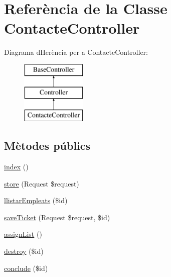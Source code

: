 \hypertarget{class_app_1_1_http_1_1_controllers_1_1_contacte_controller}{}\section{Referència de la Classe Contacte\+Controller}
\label{class_app_1_1_http_1_1_controllers_1_1_contacte_controller}
Diagrama d\textquotesingle{}Herència per a Contacte\+Controller\+:\begin{figure}[H]
\begin{center}
\leavevmode
\includegraphics[height=3.000000cm]{class_app_1_1_http_1_1_controllers_1_1_contacte_controller}
\end{center}
\end{figure}
\subsection*{Mètodes públics}
\begin{DoxyCompactItemize}
\item 
\mbox{\hyperlink{class_app_1_1_http_1_1_controllers_1_1_contacte_controller_a149eb92716c1084a935e04a8d95f7347}{index}} ()
\item 
\mbox{\hyperlink{class_app_1_1_http_1_1_controllers_1_1_contacte_controller_a9ef485163104597c12185b53cdacf638}{store}} (Request \$request)
\item 
\mbox{\hyperlink{class_app_1_1_http_1_1_controllers_1_1_contacte_controller_af2efdf19fa0bd964c7ca86e6e05f4e4a}{llistar\+Empleats}} (\$id)
\item 
\mbox{\hyperlink{class_app_1_1_http_1_1_controllers_1_1_contacte_controller_a55b79e82f946d0c70ed79fa25e322222}{save\+Ticket}} (Request \$request, \$id)
\item 
\mbox{\hyperlink{class_app_1_1_http_1_1_controllers_1_1_contacte_controller_a802b8d1289d1fc8fe0a2b05b205ef2ed}{assign\+List}} ()
\item 
\mbox{\hyperlink{class_app_1_1_http_1_1_controllers_1_1_contacte_controller_a726fa8a4b4b187b9ca32ba427aac8137}{destroy}} (\$id)
\item 
\mbox{\hyperlink{class_app_1_1_http_1_1_controllers_1_1_contacte_controller_a02fe9c154ef4bd43d3010d69a351230f}{conclude}} (\$id)
\end{DoxyCompactItemize}



